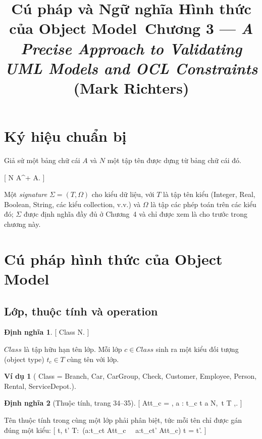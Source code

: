 \documentclass[12pt,a4paper]{article}
\title{Cú pháp và Ngữ nghĩa Hình thức của Object Model\
\large Chương 3 --- \emph{A Precise Approach to Validating UML Models and OCL Constraints} (Mark Richters)}
\author{}
\date{}
\theoremstyle{definition}
\newtheorem{dinhnghia}{Định nghĩa}
\newtheorem*{vidu}{Ví dụ}
\begin{document}
\maketitle

\section{Ký hiệu chuẩn bị}

Giả sử một bảng chữ cái $A$ và $N$ một tập tên được dựng từ bảng chữ cái đó.

[
N \subseteq A^{+} \quad{} A.
]

Một \emph{signature} $\Sigma=(T,\Omega)$ cho kiểu dữ liệu, với $T$ là tập tên kiểu (Integer, Real, Boolean, String, các kiểu collection, v.v.) và $\Omega$ là tập các phép toán trên các kiểu đó; $\Sigma$ được định nghĩa đầy đủ ở Chương~4 và chỉ được xem là cho trước trong chương này.

\section{Cú pháp hình thức của Object Model}

\subsection{Lớp, thuộc tính và operation}

\begin{dinhnghia}\label{def:class}
[
Class \subseteq N.
]
\end{dinhnghia}

$Class$ là tập hữu hạn tên lớp. Mỗi lớp $c\in Class$ sinh ra một kiểu đối tượng (object type) $t_c\in T$ cùng tên với lớp.

\begin{vidu}
[
Class = {Branch, Car, CarGroup, Check, Customer, Employee, Person, Rental, ServiceDepot}.
]
\end{vidu}

\begin{dinhnghia}[Thuộc tính, trang 34--35]\label{def:att}
[
Att_c = {, a : t_c \to t \mid a \in N,\ t \in T ,}.
]
\end{dinhnghia}

Tên thuộc tính trong cùng một lớp phải phân biệt, tức mỗi tên chỉ được gán đúng một kiểu:
[
\forall t, t' \in T:\ \bigl(a:t_c\to t \in Att_c \ \land\ a:t_c\to t' \in Att_c\bigr) \implies t = t'.
]
\end{document}
